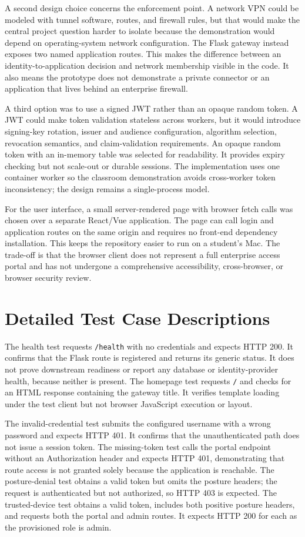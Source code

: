 A second design choice concerns the enforcement point. A network VPN could be modeled with tunnel software, routes, and firewall rules, but that would make the central project question harder to isolate because the demonstration would depend on operating-system network configuration. The Flask gateway instead exposes two named application routes. This makes the difference between an identity-to-application decision and network membership visible in the code. It also means the prototype does not demonstrate a private connector or an application that lives behind an enterprise firewall.

A third option was to use a signed JWT rather than an opaque random token. A JWT could make token validation stateless across workers, but it would introduce signing-key rotation, issuer and audience configuration, algorithm selection, revocation semantics, and claim-validation requirements. An opaque random token with an in-memory table was selected for readability. It provides expiry checking but not scale-out or durable sessions. The implementation uses one container worker so the classroom demonstration avoids cross-worker token inconsistency; the design remains a single-process model.

For the user interface, a small server-rendered page with browser fetch calls was chosen over a separate React/Vue application. The page can call login and application routes on the same origin and requires no front-end dependency installation. This keeps the repository easier to run on a student's Mac. The trade-off is that the browser client does not represent a full enterprise access portal and has not undergone a comprehensive accessibility, cross-browser, or browser security review.

\section{Detailed Test Case Descriptions}
The health test requests \texttt{/health} with no credentials and expects HTTP 200. It confirms that the Flask route is registered and returns its generic status. It does not prove downstream readiness or report any database or identity-provider health, because neither is present. The homepage test requests \texttt{/} and checks for an HTML response containing the gateway title. It verifies template loading under the test client but not browser JavaScript execution or layout.

The invalid-credential test submits the configured username with a wrong password and expects HTTP 401. It confirms that the unauthenticated path does not issue a session token. The missing-token test calls the portal endpoint without an Authorization header and expects HTTP 401, demonstrating that route access is not granted solely because the application is reachable. The posture-denial test obtains a valid token but omits the posture headers; the request is authenticated but not authorized, so HTTP 403 is expected. The trusted-device test obtains a valid token, includes both positive posture headers, and requests both the portal and admin routes. It expects HTTP 200 for each as the provisioned role is admin.


